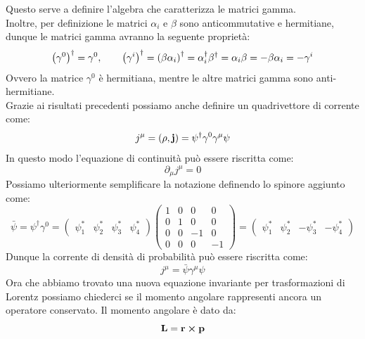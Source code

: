 Questo serve a definire l'algebra che caratterizza le matrici gamma.\\
Inoltre, per definizione le matrici $\alpha_i$ e $\beta$ sono anticommutative e hermitiane, dunque le matrici gamma avranno la seguente proprietà:
\begin{equation}
  \left(\gamma^0\right)^\dagger = \gamma^0, \qquad \left(\gamma^i\right)^\dagger = \left(\beta\alpha_i\right)^\dagger = \alpha_i^\dagger\beta^\dagger = \alpha_i\beta = -\beta \alpha_i = -\gamma^i
\end{equation}
Ovvero la matrice $\gamma^0$ è hermitiana, mentre le altre matrici gamma sono anti-hermitiane.\\
Grazie ai risultati precedenti possiamo anche definire un quadrivettore di corrente come:
\begin{equation}
  j^\mu = \left(\rho, \vb{j}\right) = \psi^\dagger \gamma^0\gamma^\mu \psi
\end{equation}
In questo modo l'equazione di continuità può essere riscritta come:
\begin{equation}
  \partial_\mu j^\mu = 0
\end{equation}
Possiamo ulteriormente semplificare la notazione definendo lo spinore aggiunto come:
\begin{equation}
  \bar{\psi} = \psi^\dagger \gamma^0 = \begin{pmatrix}
    \psi_1^* & \psi_2^* & \psi_3^* & \psi_4^*
  \end{pmatrix} \begin{pmatrix}
    1 & 0 & 0 & 0 \\
    0 & 1 & 0 & 0 \\
    0 & 0 & -1 & 0 \\
    0 & 0 & 0 & -1
  \end{pmatrix} = \begin{pmatrix}
    \psi_1^* & \psi_2^* & -\psi_3^* & -\psi_4^*
  \end{pmatrix}
\end{equation}
Dunque la corrente di densità di probabilità può essere riscritta come:
\begin{equation}
  j^\mu = \bar{\psi} \gamma^\mu \psi
\end{equation}
Ora che abbiamo trovato una nuova equazione invariante per trasformazioni di Lorentz possiamo chiederci se il momento angolare rappresenti ancora un operatore conservato. Il momento angolare è dato da:
\begin{equation}
  \vb{L} = \vb{r} \cross \vb{p}
\end{equation}
